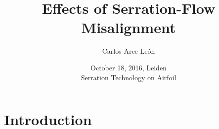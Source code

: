 \documentclass[xcolor=table,aspectratio=169]{beamer}
\begin{document}

\title[Flow-misaligned Serrations]{Effects of Serration-Flow Misalignment}

\author[Carlos Arce Le\'on]{Carlos Arce Le\'on}

\date{October 18, 2016, Leiden\\Serration Technology on Airfoil} 








\frame[plain]{
\titlepage
} 

\Agenda

%
\section{Introduction}
\end{document}
